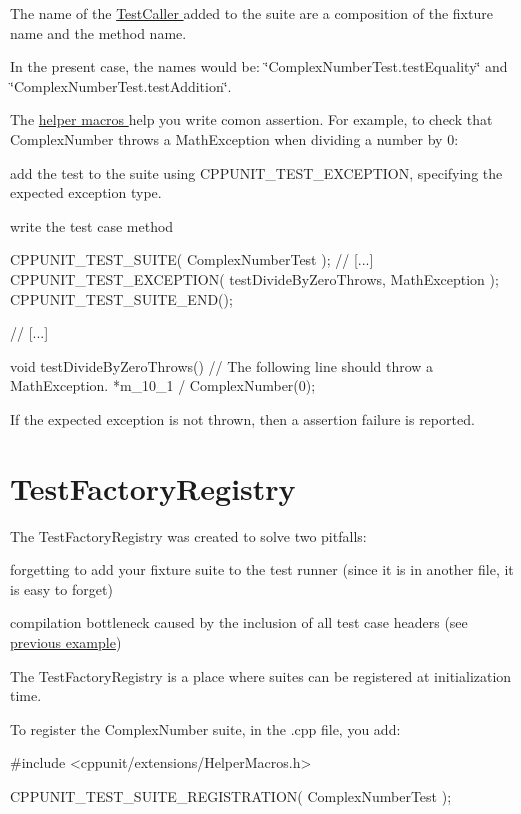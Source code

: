 The name of the \hyperlink{}{TestCaller } added to the suite are a composition of the fixture name and the method name.

In the present case, the names would be: \char`\"{}ComplexNumberTest.testEquality\char`\"{} and \char`\"{}ComplexNumberTest.testAddition\char`\"{}.

The \hyperlink{group___writing_test_fixture}{helper macros } help you write comon assertion. For example, to check that ComplexNumber throws a MathException when dividing a number by 0:
\begin{DoxyItemize}
\item add the test to the suite using CPPUNIT\_\-TEST\_\-EXCEPTION, specifying the expected exception type.
\item write the test case method
\end{DoxyItemize}


\begin{DoxyCode}
CPPUNIT_TEST_SUITE( ComplexNumberTest );
// [...]
CPPUNIT_TEST_EXCEPTION( testDivideByZeroThrows, MathException );
CPPUNIT_TEST_SUITE_END();

// [...]

  void testDivideByZeroThrows()
  {
    // The following line should throw a MathException.
    *m_10_1 / ComplexNumber(0);
  }
\end{DoxyCode}


If the expected exception is not thrown, then a assertion failure is reported.\hypertarget{cppunit_cookbook_test_factory_registry}{}\section{TestFactoryRegistry}\label{cppunit_cookbook_test_factory_registry}
The TestFactoryRegistry was created to solve two pitfalls:
\begin{DoxyItemize}
\item forgetting to add your fixture suite to the test runner (since it is in another file, it is easy to forget)
\item compilation bottleneck caused by the inclusion of all test case headers (see \hyperlink{cppunit_cookbook_test_runner_code}{previous example})
\end{DoxyItemize}

The TestFactoryRegistry is a place where suites can be registered at initialization time.

To register the ComplexNumber suite, in the .cpp file, you add:


\begin{DoxyCode}
#include <cppunit/extensions/HelperMacros.h>

CPPUNIT_TEST_SUITE_REGISTRATION( ComplexNumberTest );
\end{DoxyCode}


